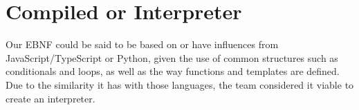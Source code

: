 \section{Compiled or Interpreter}
\label{sec:compiled-or-interpreter}
Our EBNF could be said to be based on or have influences from JavaScript/TypeScript or Python, given the use of common structures such as conditionals and loops, as well as the way functions and templates are defined. \\

Due to the similarity it has with those languages, the team considered it viable to create an interpreter.
